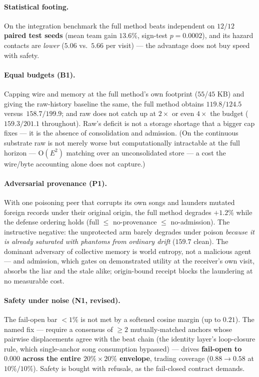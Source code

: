 \documentclass{article}
\begin{document}
\paragraph{Statistical footing.} On the integration benchmark the
full method beats independent on \textbf{$12/12$ paired test seeds}
(mean team gain $13.6\%$, sign-test $p = 0.0002$), and its hazard
contacts are \emph{lower} ($5.06$ vs.\ $5.66$ per visit) --- the
advantage does not buy speed with safety.

\paragraph{Equal budgets (B1).} Capping wire and memory at the full
method's own footprint ($55$/$45$ KB) and giving the raw-history
baseline the same, the full method obtains $119.8/124.5$ versus\ $158.7/199.9$; and
raw does not catch up at $2\times$ or even $4\times$ the budget
($159.3/201.1$ throughout). Raw's deficit is not a storage shortage
that a bigger cap fixes --- it is the absence of consolidation and
admission. (On the continuous substrate raw is not merely worse but
computationally intractable at the full horizon --- $\mathrm{O}(E^2)$
matching over an unconsolidated store --- a cost the wire/byte
accounting alone does not capture.)

\paragraph{Adversarial provenance (P1).} With one poisoning peer that
corrupts its own songs and launders mutated foreign records under
their original origin, the full method degrades $+1.2\%$ while the
defense ordering holds (full $\le$ no-provenance $\le$ no-admission).
The instructive negative: the unprotected arm barely degrades under
poison \emph{because it is already saturated with phantoms from
ordinary drift} ($159.7$ clean). The dominant adversary of collective
memory is world entropy, not a malicious agent --- and admission,
which gates on demonstrated utility at the receiver's own visit,
absorbs the liar and the stale alike; origin-bound receipt blocks the
laundering at no measurable cost.

\paragraph{Safety under noise (N1, revised).} The fail-open bar
$<1\%$ is not met by a softened cosine margin (up to $0.21$). The
named fix --- require a consensus of $\ge 2$ mutually-matched anchors
whose pairwise displacements agree with the beat chain (the identity
layer's loop-closure rule, which single-anchor song consumption
bypassed) --- drives \textbf{fail-open to $0.000$ across the entire
$20\%{\times}20\%$ envelope}, trading coverage ($0.88 \to 0.58$ at
$10\%/10\%$). Safety is bought with refusals, as the fail-closed
contract demands.
\end{document}
